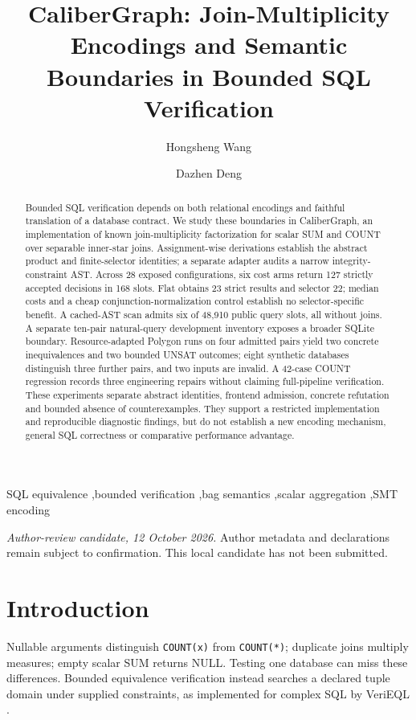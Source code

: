 \documentclass[3p,times,authoryear]{elsarticle}
\begin{document}
\begin{frontmatter}
\title{CaliberGraph: Join-Multiplicity Encodings and Semantic Boundaries in Bounded SQL Verification}
\author{Hongsheng Wang}
\author{Dazhen Deng}
\begin{abstract}
Bounded SQL verification depends on both relational encodings and faithful translation of a database contract. We study these boundaries in CaliberGraph, an implementation of known join-multiplicity factorization for scalar SUM and COUNT over separable inner-star joins. Assignment-wise derivations establish the abstract product and finite-selector identities; a separate adapter audits a narrow integrity-constraint AST. Across 28 exposed configurations, six cost arms return 127 strictly accepted decisions in 168 slots. Flat obtains 23 strict results and selector 22; median costs and a cheap conjunction-normalization control establish no selector-specific benefit. A cached-AST scan admits six of 48,910 public query slots, all without joins. A separate ten-pair natural-query development inventory exposes a broader SQLite boundary. Resource-adapted Polygon runs on four admitted pairs yield two concrete inequivalences and two bounded UNSAT outcomes; eight synthetic databases distinguish three further pairs, and two inputs are invalid. A 42-case COUNT regression records three engineering repairs without claiming full-pipeline verification. These experiments separate abstract identities, frontend admission, concrete refutation and bounded absence of counterexamples. They support a restricted implementation and reproducible diagnostic findings, but do not establish a new encoding mechanism, general SQL correctness or comparative performance advantage.
\end{abstract}
\begin{keyword}
SQL equivalence \sep bounded verification \sep bag semantics \sep scalar aggregation \sep SMT encoding
\end{keyword}
\end{frontmatter}

\noindent\textit{Author-review candidate, 12 October 2026.} Author metadata and declarations remain subject to confirmation. This local candidate has not been submitted.

\section{Introduction}
Nullable arguments distinguish \texttt{COUNT(x)} from \texttt{COUNT(*)}; duplicate joins multiply measures; empty scalar SUM returns NULL. Testing one database can miss these differences. Bounded equivalence verification instead searches a declared tuple domain under supplied constraints, as implemented for complex SQL by VeriEQL \citep{he2024verieql}.
\end{document}
